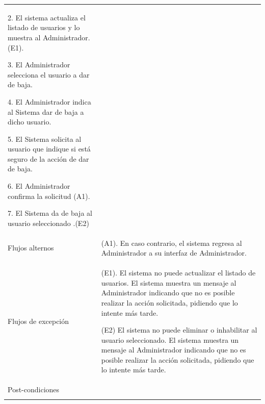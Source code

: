 \begin{longtable}{@{\extracolsep{8pt}}l p{8.5cm}}
 2. El sistema actualiza el listado de usuarios y lo muestra al Administrador.(E1). \par\vspace{.1cm}

 3. El Administrador selecciona el usuario a dar de baja. \par\vspace{.1cm}

 4. El Administrador indica al Sistema dar de baja a dicho usuario. \par\vspace{.1cm}

 5. El Sistema solicita al usuario que indique si está seguro de la acción de dar de baja. \par\vspace{.1cm}

 6. El Administrador confirma la solicitud (A1). \par\vspace{.1cm}

 7. El Sistema da de baja al usuario seleccionado .(E2) \par\vspace{.1cm}

\\

\hspace{.2cm}Flujos alternos &
\par (A1). En caso contrario, el sistema regresa al Administrador a su interfaz de Administrador.



\\

\hspace{.2cm}Flujos de excepción &
\par\vspace{.1cm} (E1). El sistema no puede actualizar el listado de usuarios. El sistema muestra un mensaje al Administrador indicando que no es posible realizar la acción solicitada, pidiendo que lo intente más tarde.

\par\vspace{.1cm} (E2) El sistema no puede eliminar o inhabilitar al usuario seleccionado. El sistema muestra un mensaje al Administrador indicando que no es posible realizar la acción solicitada, pidiendo que lo intente más tarde.


\\%

\hspace{.2cm}Post-condiciones &
\\
\hline

 \\
\end{longtable}
\endgroup



